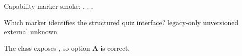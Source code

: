 \documentclass{physicsquiz}
\begin{document}

Capability marker smoke:
\physicsquizclassversion,
\physicsquizstructuredinterfaceversion,
\physicsquizstructuredinterfaceid.

\begin{quizbank}
  \begin{quizquestion}[
    id=pq6b-capability-001,
    topic=capability,
    difficulty=foundation,
    marks=1,
    correct=A,
    tags={phase6,marker}
  ]
    Which marker identifies the structured quiz interface?
    \choices
      {\physicsquizstructuredinterfaceid}
      {legacy-only}
      {unversioned}
      {external}
      {unknown}
  \end{quizquestion}
  \begin{quizsolution}
    The class exposes \physicsquizstructuredinterfaceid, so option
    \textbf{A} is correct.
  \end{quizsolution}
\end{quizbank}

\quizselectall
{}
\end{document}
